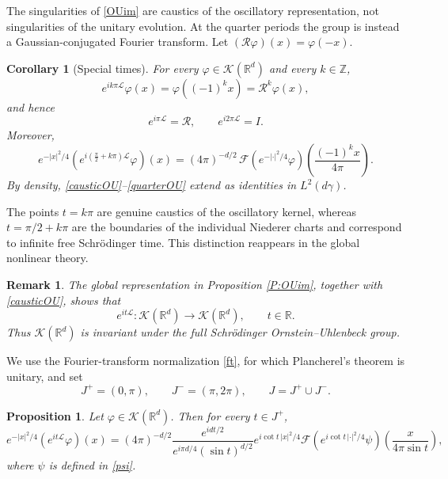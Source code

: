 \documentclass[11pt,a4paper]{amsart}
\def \vf{\varphi}
\newcommand{\Rm}{\mathbb R^d}
\numberwithin{equation}{section}
\newtheorem{proposition}[theorem]{Proposition}
\newtheorem{corollary}[theorem]{Corollary}
\newtheorem{remark}[theorem]{Remark}
\numberwithin{equation}{section}
\begin{document}
The singularities of \eqref{OUim} are caustics of the oscillatory representation, not singularities of the unitary evolution.  At the quarter periods the group is instead a Gaussian-conjugated Fourier transform.  Let $(\mathcal R\vf)(x)=\vf(-x)$.

\begin{corollary}[Special times]\label{C:quarter}
For every $\vf\in\mathscr K(\Rm)$ and every $k\in\mathbb Z$,
\begin{equation}\label{causticOU}
e^{ik\pi\mathscr L}\vf(x)=\vf((-1)^kx)=\mathcal R^k\vf(x),
\end{equation}
and hence
\begin{equation}\label{OUperiodicity}
e^{i\pi\mathscr L}=\mathcal R,\qquad e^{i2\pi\mathscr L}=I.
\end{equation}
Moreover,
\begin{equation}\label{quarterOU}
e^{-|x|^2/4}\left(e^{i(\frac\pi2+k\pi)\mathscr L}\vf\right)(x)
=(4\pi)^{-d/2}\,
\mathscr F\!\left(e^{-|\cdot|^2/4}\vf\right)
\left(\frac{(-1)^kx}{4\pi}\right).
\end{equation}
By density, \eqref{causticOU}--\eqref{quarterOU} extend as identities in $L^2(d\gamma)$.
\end{corollary}

The points $t=k\pi$ are genuine caustics of the oscillatory kernel, whereas $t=\pi/2+k\pi$ are the boundaries of the individual Niederer charts and correspond to infinite free Schr\"odinger time.  This distinction reappears in the global nonlinear theory.

\begin{remark}\label{R:stable}
The global representation in Proposition \ref{P:OUim}, together with \eqref{causticOU}, shows that
\begin{equation}\label{nice}
e^{it\mathscr L}:\mathscr K(\Rm)\longrightarrow\mathscr K(\Rm),
\qquad t\in\mathbb R.
\end{equation}
Thus $\mathscr K(\Rm)$ is invariant under the full Schr\"odinger Ornstein--Uhlenbeck group.
\end{remark}

We use the Fourier-transform normalization \eqref{ft}, for which Plancherel's theorem is unitary, and set
\[
J^+=(0,\pi),\qquad J^-=(\pi,2\pi),\qquad J=J^+\cup J^-.
\]

\begin{proposition}\label{P:semigroup}
Let $\vf\in\mathscr K(\Rm)$. Then for every $t\in J^+$,
\begin{equation}\label{final}
e^{-|x|^2/4}\left(e^{it\mathscr L}\vf\right)(x)
=(4\pi)^{-d/2}\frac{e^{idt/2}}{e^{i\pi d/4}(\sin t)^{d/2}}
 e^{i\cot t\,|x|^2/4}
\mathscr F\!\left(e^{i\cot t\,|\cdot|^2/4}\psi\right)
\left(\frac{x}{4\pi\sin t}\right),
\end{equation}
where $\psi$ is defined in \eqref{psi}.
\end{proposition}
\end{document}
